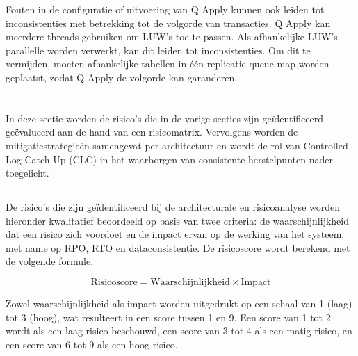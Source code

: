 Fouten in de configuratie of uitvoering van Q Apply kunnen ook leiden tot inconsistenties met betrekking tot de volgorde van transacties.
Q Apply kan meerdere threads gebruiken om LUW's toe te passen.
Als afhankelijke LUW's parallelle worden verwerkt, kan dit leiden tot inconsistenties.
Om dit te vermijden, moeten afhankelijke tabellen in één replicatie queue map worden geplaatst, zodat Q Apply de volgorde kan garanderen.

\section{}%
\label{sec:evaluatie-mitigatiestrategie}

In deze sectie worden de risico's die in de vorige secties zijn geïdentificeerd geëvalueerd aan de hand van een risicomatrix.
Vervolgens worden de mitigatiestrategieën samengevat per architectuur en wordt de rol van Controlled Log Catch-Up (CLC) in het waarborgen van consistente herstelpunten nader toegelicht.

\subsection{}%
\label{sec:risicomatrix}

De risico's die zijn geïdentificeerd bij de architecturale en risicoanalyse worden hieronder kwalitatief beoordeeld op basis van twee criteria: de waarschijnlijkheid dat een risico zich voordoet en de impact ervan op de werking van het systeem, met name op RPO, RTO en dataconsistentie.
De risicoscore wordt berekend met de volgende formule.

\begin{equation}
    \text{Risicoscore} = \text{Waarschijnlijkheid} \times \text{Impact}
\end{equation}

Zowel waarschijnlijkheid als impact worden uitgedrukt op een schaal van 1 (laag) tot 3 (hoog), wat resulteert in een score tussen 1 en 9.
Een score van 1 tot 2 wordt als een laag risico beschouwd, een score van 3 tot 4 als een matig risico, en een score van 6 tot 9 als een hoog risico.

